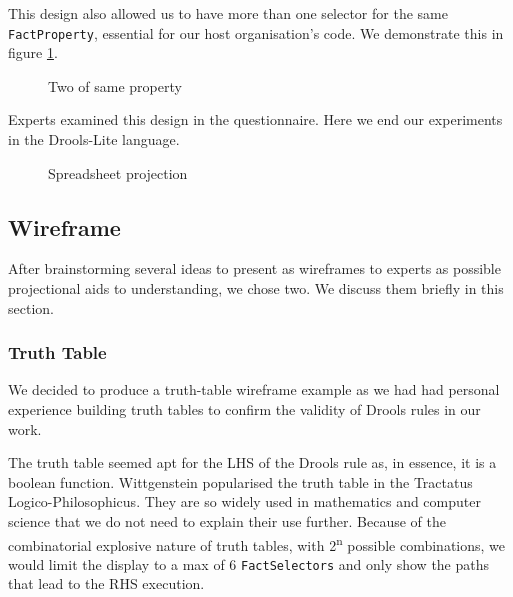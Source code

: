 This design also allowed us to have more than one selector for the same \texttt{FactProperty}, essential for our host organisation's code.
We demonstrate this in figure \ref{fig:TwoProperties}.

\begin{figure}[h]
    \centering
    \caption{Two of same property}
    \label{fig:TwoProperties}
\end{figure}

Experts examined this design in the questionnaire. 
Here we end our experiments in the Drools-Lite language.

\begin{figure}
    \centering
    \caption{Spreadsheet projection}
    \label{fig:SpreadsheetProjection}
\end{figure}

\subsection{Wireframe}

After brainstorming several ideas to present as wireframes to experts as possible projectional aids to understanding, we chose two.
We discuss them briefly in this section.

\subsubsection{Truth Table}
We decided to produce a truth-table wireframe example as we had had personal experience building truth tables to confirm the validity of Drools rules in our work.

The truth table seemed apt for the LHS of the Drools rule as, in essence, it is a boolean function.
Wittgenstein popularised the truth table in the Tractatus Logico-Philosophicus\cite{wittgenstein2013tractatus}.
They are so widely used in mathematics and computer science that we do not need to explain their use further.
Because of the combinatorial explosive nature of truth tables, with 2\textsuperscript{n} possible combinations, we would limit the display to a max of 6 \texttt{FactSelectors} and only show the paths that lead to the RHS execution.

